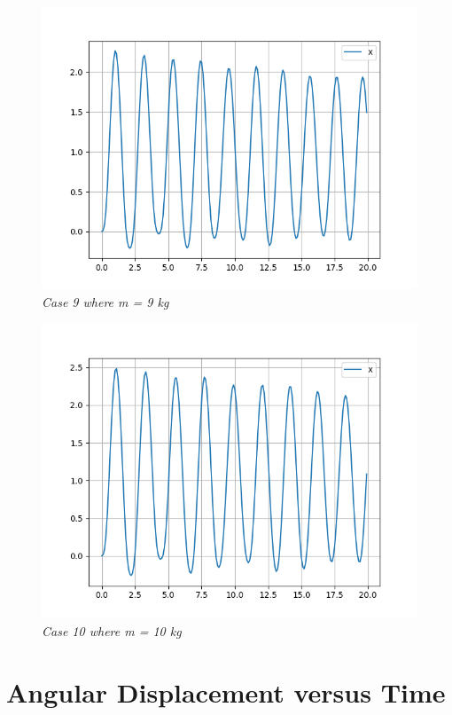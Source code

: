         \begin{figure}[H]
            \centering
            \includegraphics{Appendix/RExpPictures/R/rm9.png}
            \caption{\textit{Case 9 where m = 9 kg}}
            \label{}
        \end{figure}
            
        \begin{figure}[H]
            \centering
            \includegraphics{Appendix/RExpPictures/R/rm10.png}
            \caption{\textit{Case 10 where m = 10 kg}}
            \label{}
        \end{figure}
            
    \section{{Angular Displacement versus Time}}
            

